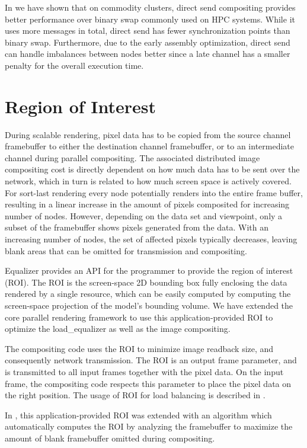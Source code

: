 In \cite{EP:07} we have shown that on commodity clusters, direct send
compositing provides better performance over binary swap commonly used on HPC
systems. While it uses more messages in total, direct send has fewer
synchronization points than binary swap. Furthermore, due to the early assembly
optimization, direct send can handle imbalances between nodes better since a
late channel has a smaller penalty for the overall execution time.


\section{Region of Interest}

During scalable rendering, pixel data has to be copied from the source channel
framebuffer to either the destination channel framebuffer, or to an
intermediate channel during parallel compositing. The associated distributed
image compositing cost is directly dependent on how much data has to be sent
over the network, which in turn is related to how much screen space is actively
covered. For sort-last rendering every node potentially renders into the entire
frame buffer, resulting in a linear increase in the amount of pixels composited
for increasing number of nodes. However, depending on the data set and
viewpoint, only a subset of the framebuffer shows pixels generated from the
data. With an increasing number of nodes, the set of affected pixels typically
decreases, leaving blank areas that can be omitted for transmission and
compositing.

Equalizer provides an API for the programmer to provide the region of interest
(ROI). The ROI is the screen-space 2D bounding box fully enclosing the data
rendered by a single resource, which can be easily computed by computing the
screen-space projection of the model's bounding volume. We have extended the
core parallel rendering framework to use this application-provided ROI to
optimize the \textsf{load\_equalizer} as well as the image compositing.

The compositing code uses the ROI to minimize image readback size, and
consequently network transmission. The ROI is an output frame parameter, and is
transmitted to all input frames together with the pixel data. On the input
frame, the compositing code respects this parameter to place the pixel data on
the right position. The usage of ROI for load balancing is described in
.

In \cite{MEP:10}, this application-provided ROI was extended with an algorithm
which automatically computes the ROI by analyzing the framebuffer to maximize
the amount of blank framebuffer omitted during compositing.

